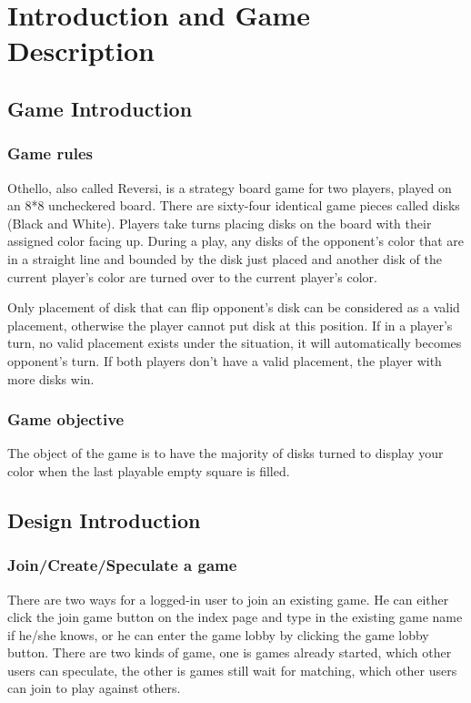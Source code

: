 \section{Introduction and Game Description}
\subsection{Game Introduction}
\subsubsection{Game rules}
Othello, also called Reversi, is a strategy board game for two players, played 
on an 8*8 uncheckered board. There are sixty-four identical game pieces called 
disks (Black and White). Players take turns placing disks on the board with 
their assigned color facing up. During a play, any disks of the opponent's color 
that are in a straight line and bounded by the disk just placed and another disk 
of the current player's color are turned over to the current player's color.

Only placement of disk that can flip opponent's disk can be considered as a valid placement, otherwise the player cannot put disk at this position. If in a player's turn, no valid placement exists under the situation, it will automatically becomes opponent's turn. If both players don't have a valid placement, the player with more disks win.

\subsubsection{Game objective}
The object of the game is to have the majority of disks turned to display your 
color when the last playable empty square is filled.

\subsection{Design Introduction}

\subsubsection{Join/Create/Speculate a game} There are two ways for a logged-in 
user to join an existing game. He can either 
click the join game button on the index page and type in the existing game name
if he/she knows, or he can enter the game lobby by clicking the 
game lobby button. There are two kinds of game, one is games already started, 
which other users can speculate, the other is games still wait for matching, 
which other users can join to play against others. 

